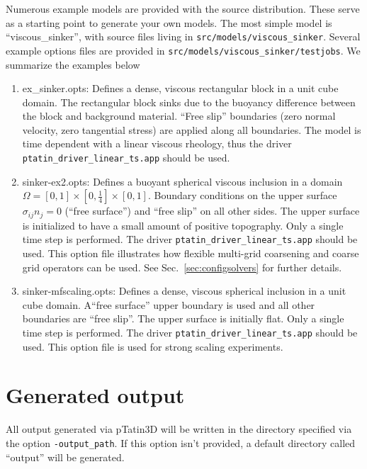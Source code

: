 \documentclass[paper=a4, fontsize=11pt,twoside]{scrartcl}
\newcommand{\ptat}{{{\sc pTatin3D}}}
\newcommand{\unix}[1]{\texttt{\footnotesize #1}}
\begin{document}
{{Numerous example models are provided with the source distribution. These serve as a starting point to generate your own models. The most simple model is ``viscous\_sinker'', with source files living in \unix{src/models/viscous\_sinker}. Several example options files are provided in \unix{src/models/viscous\_sinker/testjobs}. We summarize the examples below
\begin{enumerate}
	\item ex\_sinker.opts: Defines a dense, viscous rectangular block in a unit cube domain. The rectangular block sinks due to the buoyancy difference between the block and background material. ``Free slip'' boundaries (zero normal velocity, zero tangential stress) are applied along all boundaries. The model is time dependent with a linear viscous rheology, thus the driver \unix{ptatin\_driver\_linear\_ts.app} should be used.

	\item sinker-ex2.opts: Defines a buoyant spherical viscous inclusion in a domain $\Omega = [0,1] \times [0,\tfrac{1}{4}] \times [0,1]$. Boundary conditions on the upper surface $\sigma_{ij}n_j=0$ (``free surface'') and ``free slip'' on all other sides. The upper surface is initialized to have a small amount of positive topography. Only a single time step is performed. The driver \unix{ptatin\_driver\_linear\_ts.app} should be used. This option file illustrates how flexible multi-grid coarsening and coarse grid operators can be used. See Sec.~\ref{sec:configsolvers} for further details.

	\item sinker-mfscaling.opts: Defines a dense, viscous spherical inclusion in a unit cube domain. A``free surface'' upper boundary is used and all other boundaries are ``free slip''. The upper surface is initially flat. Only a single time step is performed. The driver \unix{ptatin\_driver\_linear\_ts.app} should be used. This option file is used for strong scaling experiments.
\end{enumerate}

\newpage
\section{Generated output}
All output generated via {\ptat} will be written in the directory specified via the option \unix{-output\_path}. If this option isn't provided, a default directory called ``output'' will be generated.

}}
\end{document}
